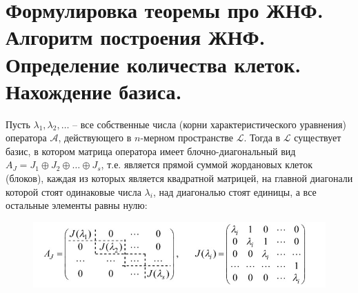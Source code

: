 \section{
    Формулировка теоремы про ЖНФ. Алгоритм построения ЖНФ. Определение количества клеток. Нахождение базиса. 
}

\begin{theorem}
    Пусть $\lambda_1, \lambda_2, \ldots$ – все собственные числа (корни характеристического уравнения) оператора $\mathscr{A}$, действующего в $n$-мерном пространстве $\mathcal{L}$. Тогда в $\mathcal{L}$ существует базис, в котором матрица оператора имеет блочно-диагональный вид $A_J = J_1 \oplus J_2 \oplus \ldots \oplus J_s$, т.е. является прямой суммой жордановых клеток (блоков), каждая из которых является квадратной матрицей, на главной диагонали которой стоят одинаковые числа $\lambda_i$, над диагональю стоят единицы, а все остальные элементы равны нулю:

    \begin{figure}[H]
        \centering
        \includegraphics[scale=0.7]{images/27_1.jpg}
        \label{fig:picture_27_1}
    \end{figure} 
\end{theorem}

